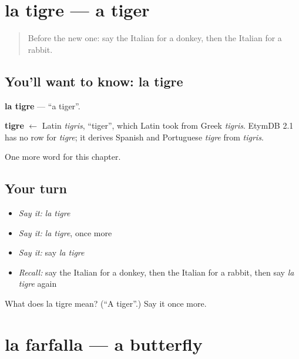 \section[la tigre]{la tigre — a tiger}

\label{lesson:IT-C120-tigre}



\begin{quote}
Before the new one: say the Italian for a donkey, then the Italian for a rabbit.
\end{quote}

\subsection*{You'll want to know: la tigre}
\textbf{la tigre} — \textquotedblleft{}a tiger\textquotedblright{}.

\begin{cousinweb}
\textbf{tigre} $\leftarrow$ Latin \emph{tigris}, \textquotedblleft{}tiger\textquotedblright{}, which Latin took from Greek \emph{tigris}. EtymDB 2.1 has no row for \emph{tigre}; it derives Spanish and Portuguese \emph{tigre} from \emph{tigris}.
\end{cousinweb}

\begin{grammarlens}[title={What you've built}]
One more word for this chapter.
\end{grammarlens}

\subsection*{Your turn}
\begin{itemize}
\raggedright
  \item \emph{Say it:} \emph{la tigre}
  \item \emph{Say it:} \emph{la tigre}, once more
  \item \emph{Say it:} say \emph{la tigre}
  \item \emph{Recall:} say the Italian for a donkey, then the Italian for a rabbit, then say \emph{la tigre} again
\end{itemize}

\begin{tcolorbox}[breakable,colback=teal!4,colframe=teal!35!black,title={Before you move on}]
What does la tigre mean? (\textquotedblleft{}A tiger\textquotedblright{}.) Say it once more.
\end{tcolorbox}
\section[la farfalla]{la farfalla — a butterfly}


